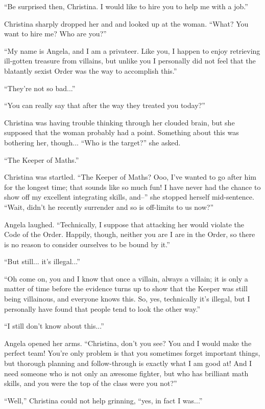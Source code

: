 \documentclass[showtrims,b6paper,draft,10pt]{memoir}
\begin{document}
``Be surprised then, Christina.  I would like to hire you to help me with a job.''

Christina sharply dropped her and and looked up at the woman.  ``What?  You want to hire me? Who are you?''

``My name is Angela, and I am a privateer.  Like you, I happen to enjoy retrieving ill-gotten treasure from villains, but unlike you I personally did not feel that the blatantly sexist Order was the way to accomplish this.''

``They're not so bad...''

``You can really say that after the way they treated you today?''

Christina was having trouble thinking through her clouded brain, but she supposed that the woman probably had a point.  Something about this was bothering her, though...  ``Who is the target?'' she asked.

``The Keeper of Maths.''

Christina was startled.  ``The Keeper of Maths?  Ooo, I've wanted to go after him for the longest time;  that sounds like so much fun!  I have never had the chance to show off my excellent integrating skills, and--'' she stopped herself mid-sentence.  ``Wait, didn't he recently surrender and so is off-limits to us now?''

Angela laughed.  ``Technically, I suppose that attacking her would violate the Code of the Order.  Happily, though, neither you are I are in the Order, so there is no reason to consider ourselves to be bound by it.''

``But still... it's illegal...''

``Oh come on, you and I know that once a villain, always a villain;  it is only a matter of time before the evidence turns up to show that the Keeper was still being villainous, and everyone knows this.  So, yes, technically it's illegal, but I personally have found that people tend to look the other way.''

``I still don't know about this...''

Angela opened her arms.  ``Christina, don't you see?  You and I would make the perfect team!  You're only problem is that you sometimes forget important things, but thorough planning and follow-through is exactly what I am good at!  And I need someone who is not only an awesome fighter, but who has brilliant math skills, and you were the top of the class were you not?''

``Well,'' Christina could not help grinning, ``yes, in fact I was...''
\end{document}
